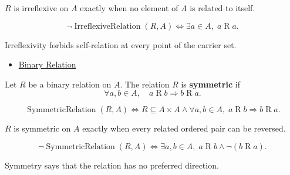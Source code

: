 \begin{remark*}
$R$ is irreflexive on $A$ exactly when no element of $A$ is related to itself.
\end{remark*}

\begin{remark*}
\[
\neg\operatorname{IrreflexiveRelation}(R,A)
\Longleftrightarrow
\exists a\in A,\; a\mathrel{R}a.
\]
\end{remark*}

\begin{remark*}[Interpretation]
Irreflexivity forbids self-relation at every point of the carrier set.
\end{remark*}

\begin{dependencies}
\begin{itemize}
  \item \hyperref[def:binary-relation]{Binary Relation}
\end{itemize}
\end{dependencies}

\begin{definition}
\label{def:rel-symmetric}
Let $R$ be a binary relation on $A$.
The relation $R$ is \textbf{symmetric} if
\[
\forall a,b \in A,\quad
a \mathrel{R} b \Rightarrow b \mathrel{R} a.
\]
\end{definition}

\begin{remark*}
\[
\operatorname{SymmetricRelation}(R,A)
\Longleftrightarrow
R\subseteq A\times A
\land
\forall a,b\in A,\; a\mathrel{R}b \Rightarrow b\mathrel{R}a.
\]
\end{remark*}

\begin{remark*}
$R$ is symmetric on $A$ exactly when every related ordered pair can be reversed.
\end{remark*}

\begin{remark*}
\[
\neg\operatorname{SymmetricRelation}(R,A)
\Longleftrightarrow
\exists a,b\in A,\; a\mathrel{R}b \land \lnot(b\mathrel{R}a).
\]
\end{remark*}

\begin{remark*}[Interpretation]
Symmetry says that the relation has no preferred direction.
\end{remark*}

